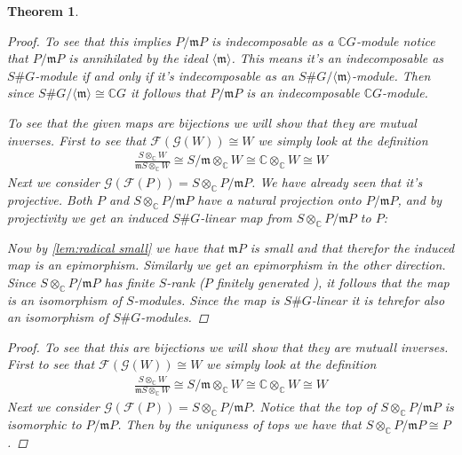 \documentclass[11pt, a4paper, english]{article}
\numberwithin{prop}{section}
\numberwithin{lemma}{section}
\newtheorem{theorem}{Theorem}
\numberwithin{theorem}{section}
\numberwithin{defin}{section}
\numberwithin{example}{section}
\newcommand{\C}{\mathbb{C}}
\begin{document}
\begin{theorem}
\begin{proof}
To see that this implies $P/\mathfrak{m}P$ is indecomposable as a $\C G$-module notice that $P/\mathfrak{m}P$ is annihilated by the ideal $\langle \mathfrak{m} \rangle$. This means it's an indecomposable as $S\#G$-module if and only if it's indecomposable as an $S\#G/\langle \mathfrak{m} \rangle$-module. Then since $S\#G/\langle \mathfrak{m} \rangle \cong \C G$ it follows that $P/\mathfrak{m}P$ is an indecomposable $\C G$-module.

To see that the given maps are bijections we will show that they are mutual inverses. First to see that $\mathcal{F}(\mathcal{G}(W)) \cong W$ we simply look at the definition
\begin{equation*}
\begin{split}
\frac{S \otimes_\C W}{\mathfrak{m}S \otimes_\C W} \cong S/\mathfrak{m} \otimes_\C W \cong \C \otimes_\C W \cong W
\end{split}
\end{equation*}
Next we consider $\mathcal{G}(\mathcal{F}(P)) = S \otimes_\C P/\mathfrak{m}P$. We have already seen that it's projective. Both $P$ and $S \otimes_\C P/\mathfrak{m}P$ have a natural projection onto $P/\mathfrak{m}P$, and by projectivity we get an induced $S\#G$-linear map from $S \otimes_\C P/\mathfrak{m}P$ to $P$:
\begin{center}
\end{center}
Now by \cref{lem:radical small} we have that $\mathfrak{m}P$ is small and that therefor the induced map is an epimorphism. Similarly we get an epimorphism in the other direction. Since $S \otimes_\C P/\mathfrak{m}P$ has finite $S$-rank ($P$ finitely generated {\color{red}{Why is P finitely generated? This would be true if P/mP is indec CG-module, so if thats clear this should be clear}}), it follows that the map is an isomorphism of $S$-modules. Since the map is $S\#G$-linear it is tehrefor also an isomorphism of $S\#G$-modules.
\end{proof}

\iffalse
\begin{proof}
To see that this are bijections we will show that they are mutuall inverses. First to see that $\mathcal{F}(\mathcal{G}(W)) \cong W$ we simply look at the definition
\begin{equation*}
\begin{split}
\frac{S \otimes_\C W}{\mathfrak{m}S \otimes_\C W} \cong S/\mathfrak{m} \otimes_\C W \cong \C \otimes_\C W \cong W
\end{split}
\end{equation*}
Next we consider $\mathcal{G}(\mathcal{F}(P)) = S \otimes_\C P/\mathfrak{m}P$. Notice that the top of $ S \otimes_\C P/\mathfrak{m}P$ is isomorphic to $P/\mathfrak{m}P$. Then by the uniquness of tops we have that $ S \otimes_\C P/\mathfrak{m}P \cong P$.


\end{proof}
\end{theorem}
\end{document}
